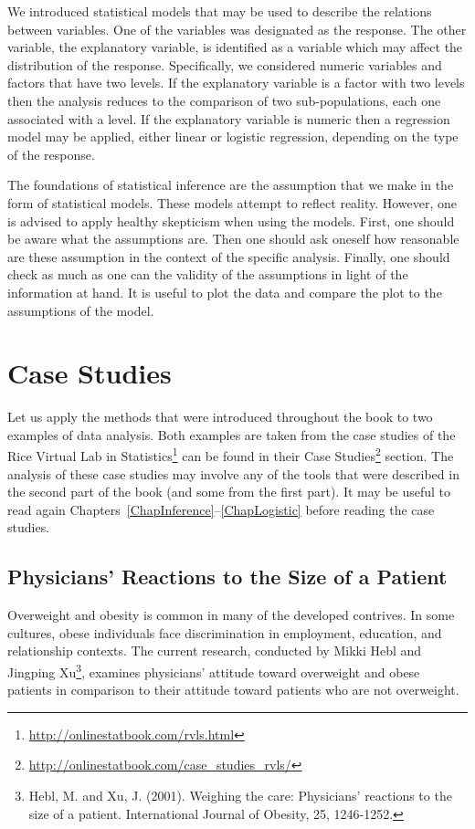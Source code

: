 \documentclass[]{krantz}
\renewcommand{\href}[2]{#2\footnote{\url{#1}}}
\theoremstyle{definition}
\theoremstyle{definition}
\theoremstyle{definition}
\theoremstyle{remark}
\begin{document}
We introduced statistical models that may be used to describe the
relations between variables. One of the variables was designated as the
response. The other variable, the explanatory variable, is identified as
a variable which may affect the distribution of the response.
Specifically, we considered numeric variables and factors that have two
levels. If the explanatory variable is a factor with two levels then the
analysis reduces to the comparison of two sub-populations, each one
associated with a level. If the explanatory variable is numeric then a
regression model may be applied, either linear or logistic regression,
depending on the type of the response.

The foundations of statistical inference are the assumption that we make
in the form of statistical models. These models attempt to reflect
reality. However, one is advised to apply healthy skepticism when using
the models. First, one should be aware what the assumptions are. Then
one should ask oneself how reasonable are these assumption in the
context of the specific analysis. Finally, one should check as much as
one can the validity of the assumptions in light of the information at
hand. It is useful to plot the data and compare the plot to the
assumptions of the model.

\section{Case Studies}\label{case-studies}

Let us apply the methods that were introduced throughout the book to two
examples of data analysis. Both examples are taken from the case studies
of the \href{http://onlinestatbook.com/rvls.html}{Rice Virtual Lab in
Statistics} can be found in their
\href{http://onlinestatbook.com/case_studies_rvls/}{Case Studies}
section. The analysis of these case studies may involve any of the tools
that were described in the second part of the book (and some from the
first part). It may be useful to read again
Chapters~\ref{ChapInference}--\ref{ChapLogistic} before reading the case
studies.

\subsection{Physicians' Reactions to the Size of a
Patient}\label{physicians-reactions-to-the-size-of-a-patient}

Overweight and obesity is common in many of the developed contrives. In
some cultures, obese individuals face discrimination in employment,
education, and relationship contexts. The current research, conducted by
Mikki Hebl and Jingping Xu\footnote{Hebl, M. and Xu, J. (2001). Weighing
  the care: Physicians' reactions to the size of a patient.
  International Journal of Obesity, 25, 1246-1252.}, examines
physicians' attitude toward overweight and obese patients in comparison
to their attitude toward patients who are not overweight.
\end{document}
